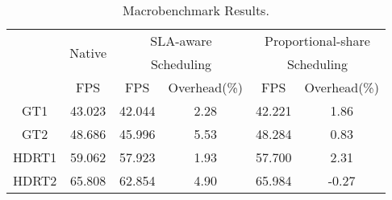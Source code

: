 \documentclass[paper=a4, fontsize=11pt]{scrartcl} %
\numberwithin{equation}{section} %
\numberwithin{figure}{section} %
\numberwithin{table}{section} %
\begin{document}
	\begin{table}
		\begin{center}
			\begin{tabular}{c |c |c c |c c}
				\hline\multirow{3}{*}{} & \multirow{2}{*}{Native} & \multicolumn{2}{c}{SLA-aware} & \multicolumn{2}{c}{Proportional-share} \\
				& & \multicolumn{2}{c}{Scheduling} & \multicolumn{2}{c}{Scheduling}\\
				\cline{2-6}
				& FPS & FPS & Overhead(\%) & FPS &Overhead(\%)\\
				\hline
				GT1 & 43.023 & 42.044 & 2.28 & 42.221 & 1.86 \\
				GT2 & 48.686 & 45.996 & 5.53 & 48.284 & 0.83\\
				HDRT1 & 59.062 & 57.923 & 1.93 & 57.700 & 2.31 \\
				HDRT2 & 65.808 & 62.854 & 4.90 & 65.984 & -0.27 \\
				\hline
			\end{tabular}
		\end{center}
		\caption{Macrobenchmark Results.}
	\end{table}
\end{document}
